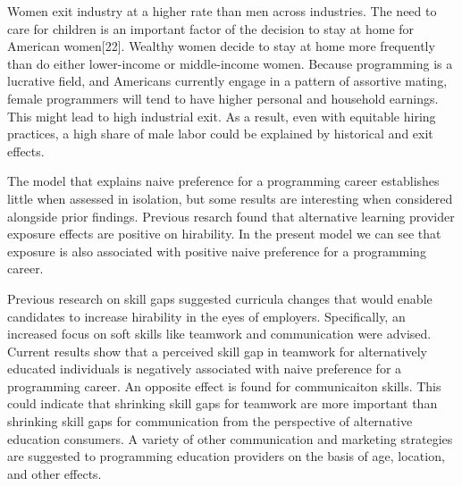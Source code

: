 \documentclass[review]{elsarticle}
\begin{document}
Women exit industry at a higher rate than men across industries.
The need to care for children is an important factor of the decision to stay at home
for American women[22].
Wealthy women decide to stay at home more frequently than do either lower-income
or middle-income women.
Because programming is a lucrative field,
and Americans currently engage in a pattern of assortive mating,
female programmers will tend to have higher personal and household earnings.
This might lead to high industrial exit.
As a result, even with equitable hiring practices,
a high share of male labor could be explained by historical and exit effects.

The model that explains naive preference for a programming career
establishes little when assessed in isolation,
but some results are interesting when considered alongside prior findings.
Previous resarch found that alternative learning provider exposure effects are positive on hirability. %
In the present model we can see that exposure is also associated with positive naive preference for a programming career.

Previous research on skill gaps suggested curricula changes that would enable
candidates to increase hirability in the eyes of employers.
Specifically, an increased focus on soft skills like teamwork and communication were advised. %
Current results show that a perceived skill gap in teamwork for alternatively educated individuals
is negatively associated with naive preference for a programming career.
An opposite effect is found for communicaiton skills.
This could indicate that shrinking skill gaps for teamwork are more important
than shrinking skill gaps for communication
from the perspective of alternative education consumers.
A variety of other communication and marketing strategies are suggested
to programming education providers
on the basis of age, location, and other effects.

\end{document}
